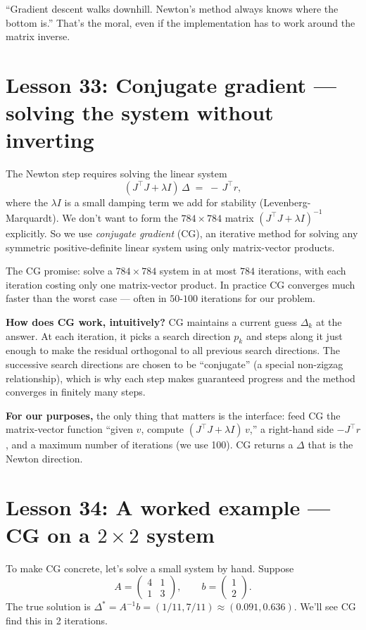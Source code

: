 \documentclass[11pt]{article}
\begin{document}
\begin{key}
``Gradient descent walks downhill. Newton's method always knows where
the bottom is.'' That's the moral, even if the implementation has to
work around the matrix inverse.
\end{key}

\section{Lesson 33: Conjugate gradient --- solving the system without inverting}

The Newton step requires solving the linear system
\[
(J^\top J + \lambda I)\,\Delta \;=\; -\,J^\top r,
\]
where the $\lambda I$ is a small damping term we add for stability
(Levenberg-Marquardt). We don't want to form the $784 \times 784$
matrix $(J^\top J + \lambda I)^{-1}$ explicitly. So we use
\emph{conjugate gradient} (CG), an iterative method for solving any
symmetric positive-definite linear system using only matrix-vector
products.

The CG promise: solve a $784 \times 784$ system in at most $784$
iterations, with each iteration costing only one matrix-vector product.
In practice CG converges much faster than the worst case --- often in
$50$-$100$ iterations for our problem.

\textbf{How does CG work, intuitively?} CG maintains a current guess
$\Delta_k$ at the answer. At each iteration, it picks a search
direction $p_k$ and steps along it just enough to make the residual
orthogonal to all previous search directions. The successive search
directions are chosen to be ``conjugate'' (a special non-zigzag
relationship), which is why each step makes guaranteed progress and
the method converges in finitely many steps.

\textbf{For our purposes,} the only thing that matters is the
interface: feed CG the matrix-vector function ``given $v$, compute
$(J^\top J + \lambda I)\,v$,'' a right-hand side $-J^\top r$, and a
maximum number of iterations (we use 100). CG returns a $\Delta$ that
is the Newton direction.

\section{Lesson 34: A worked example --- CG on a $2\times 2$ system}

To make CG concrete, let's solve a small system by hand. Suppose
\[
A = \begin{pmatrix} 4 & 1 \\ 1 & 3 \end{pmatrix},
\qquad
b = \begin{pmatrix} 1 \\ 2 \end{pmatrix}.
\]
The true solution is $\Delta^* = A^{-1} b = (1/11, 7/11) \approx
(0.091, 0.636)$. We'll see CG find this in 2 iterations.
\end{document}
